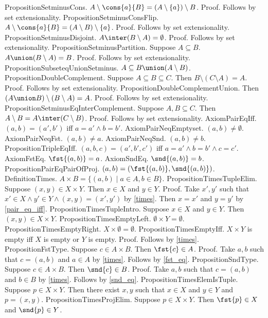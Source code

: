 PropositionSetminusCons. $A \setminus \cons{a}{B} = (A \setminus \{a \}) \setminus B$.
Proof. Follows by set extensionality.
PropositionSetminusConsFlip. $A \setminus \cons{a}{B} = (A \setminus B) \setminus \{a \}$.
Proof. Follows by set extensionality.
PropositionSetminusDisjoint. $A \inter (B \setminus A) = \emptyset$.
Proof. Follows by set extensionality.
PropositionSetminusPartition. Suppose $A \subseteq B$. $A \union (B \setminus A) = B$.
Proof. Follows by set extensionality.
PropositionSubseteqUnionSetminus. $A \subseteq B \union (A \setminus B)$.
PropositionDoubleComplement. Suppose $A \subseteq B \subseteq C$. Then $B \setminus (C \setminus A) = A$.
Proof. Follows by set extensionality.
PropositionDoubleComplementUnion. Then $(A \union B) \setminus (B \setminus A) = A$.
Proof. Follows by set extensionality.
PropositionSetminusEqInterComplement. Suppose $A, B \subseteq C$. Then $A \setminus B = A \inter (C \setminus B)$.
Proof. Follows by set extensionality.
AxiomPairEqIff. $(a, b) = (a', b')$ iff $a = a' \land b = b'$.
AxiomPairNeqEmptyset. $(a, b) \neq \emptyset$.
AxiomPairNeqFst. $(a, b) \neq a$.
AxiomPairNeqSnd. $(a, b) \neq b$.
PropositionTripleEqIff. $(a, b, c) = (a', b', c')$ iff $a = a' \land b = b' \land c = c'$.
AxiomFstEq. $ \fst{(a, b)} = a$.
AxiomSndEq. $ \snd{(a, b)} = b$.
PropositionPairEqPairOfProj. $(a, b) = ( \fst{(a,b)}, \snd{(a,b)})$.
DefinitionTimes. $A \times B = \{ (a,b) \mid a \in A, b \in B \}$.
PropositionTimesTupleElim. Suppose $(x, y) \in X \times Y$. Then $x \in X$ and $y \in Y$.
Proof. Take $x', y'$ such that $x' \in X \land y' \in Y \land (x, y) = (x', y')$ by \cref{times}. Then $x = x'$ and $y = y'$ by \cref{pair_eq_iff}.
PropositionTimesTupleIntro. Suppose $x \in X$ and $y \in Y$. Then $(x, y) \in X \times Y$.
PropositionTimesEmptyLeft. $ \emptyset \times Y = \emptyset$.
PropositionTimesEmptyRight. $X \times \emptyset = \emptyset$.
PropositionTimesEmptyIff. $X \times Y$ is empty iff $X$ is empty or $Y$ is empty.
Proof. Follows by \cref{times}.
PropositionFstType. Suppose $c \in A \times B$. Then $ \fst{c} \in A$.
Proof. Take $a, b$ such that $c = (a, b)$ and $a \in A$ by \cref{times}. Follows by \cref{fst_eq}. %
PropositionSndType. Suppose $c \in A \times B$. Then $ \snd{c} \in B$.
Proof. Take $a, b$ such that $c = (a, b)$ and $b \in B$ by \cref{times}. Follows by \cref{snd_eq}. %
PropositionTimesElemIsTuple. Suppose $p \in X \times Y$. Then there exist $x, y$ such that $x \in X$ and $y \in Y$ and $p = (x, y)$.
PropositionTimesProjElim. Suppose $p \in X \times Y$. Then $ \fst{p} \in X$ and $ \snd{p} \in Y$.
